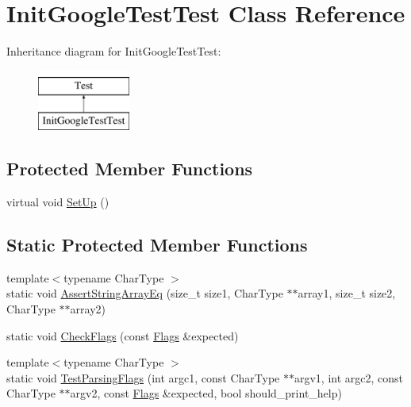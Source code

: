 \hypertarget{classtesting_1_1InitGoogleTestTest}{\section{\-Init\-Google\-Test\-Test \-Class \-Reference}
\label{d7/dd1/classtesting_1_1InitGoogleTestTest}
}
\-Inheritance diagram for \-Init\-Google\-Test\-Test\-:\begin{figure}[H]
\begin{center}
\leavevmode
\includegraphics[height=2.000000cm]{d7/dd1/classtesting_1_1InitGoogleTestTest}
\end{center}
\end{figure}
\subsection*{\-Protected \-Member \-Functions}
\begin{DoxyCompactItemize}
\item 
virtual void \hyperlink{classtesting_1_1InitGoogleTestTest_a901706a587f9ae84df8b2395fbe759cb}{\-Set\-Up} ()
\end{DoxyCompactItemize}
\subsection*{\-Static \-Protected \-Member \-Functions}
\begin{DoxyCompactItemize}
\item 
{\footnotesize template$<$typename Char\-Type $>$ }\\static void \hyperlink{classtesting_1_1InitGoogleTestTest_ae74713d5a5d19c5572ac8c891192814f}{\-Assert\-String\-Array\-Eq} (size\-\_\-t size1, \-Char\-Type $\ast$$\ast$array1, size\-\_\-t size2, \-Char\-Type $\ast$$\ast$array2)
\item 
static void \hyperlink{classtesting_1_1InitGoogleTestTest_a293b8dcb094183aba2ed9433a3641f1a}{\-Check\-Flags} (const \hyperlink{structtesting_1_1Flags}{\-Flags} \&expected)
\item 
{\footnotesize template$<$typename Char\-Type $>$ }\\static void \hyperlink{classtesting_1_1InitGoogleTestTest_ae072e735f6e1c1ac05a2341ca9e5e479}{\-Test\-Parsing\-Flags} (int argc1, const \-Char\-Type $\ast$$\ast$argv1, int argc2, const \-Char\-Type $\ast$$\ast$argv2, const \hyperlink{structtesting_1_1Flags}{\-Flags} \&expected, bool should\-\_\-print\-\_\-help)
\end{DoxyCompactItemize}


